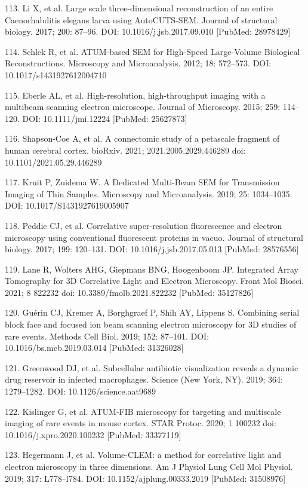 \documentclass{article}
\begin{document}
\begin{hangpars}
113. Li X, et al. Large scale three-dimensional reconstruction of an entire Caenorhabditis elegans larva using AutoCUTS-SEM. Journal of structural biology. 2017; 200: 87–96. DOI: 10.1016/j.jsb.2017.09.010 [PubMed: 28978429]

114. Schlek R, et al. ATUM-based SEM for High-Speed Large-Volume Biological Reconstructions. Microscopy and Microanalysis. 2012; 18: 572–573. DOI: 10.1017/s1431927612004710

115. Eberle AL, et al. High-resolution, high-throughput imaging with a multibeam scanning electron microscope. Journal of Microscopy. 2015; 259: 114–120. DOI: 10.1111/jmi.12224 [PubMed: 25627873]

116. Shapson-Coe A, et al. A connectomic study of a petascale fragment of human cerebral cortex. bioRxiv. 2021; 2021.2005.2029.446289 doi: 10.1101/2021.05.29.446289

117. Kruit P, Zuidema W. A Dedicated Multi-Beam SEM for Transmission Imaging of Thin Samples. Microscopy and Microanalysis. 2019; 25: 1034–1035. DOI: 10.1017/S1431927619005907

118. Peddie CJ, et al. Correlative super-resolution fluorescence and electron microscopy using conventional fluorescent proteins in vacuo. Journal of structural biology. 2017; 199: 120–131. DOI: 10.1016/j.jsb.2017.05.013 [PubMed: 28576556]

119. Lane R, Wolters AHG, Giepmans BNG, Hoogenboom JP. Integrated Array Tomography for 3D Correlative Light and Electron Microscopy. Front Mol Biosci. 2021; 8 822232 doi: 10.3389/fmolb.2021.822232 [PubMed: 35127826]

120. Guérin CJ, Kremer A, Borghgraef P, Shih AY, Lippens S. Combining serial block face and focused ion beam scanning electron microscopy for 3D studies of rare events. Methods Cell Biol. 2019; 152: 87–101. DOI: 10.1016/bs.mcb.2019.03.014 [PubMed: 31326028]

121. Greenwood DJ, et al. Subcellular antibiotic visualization reveals a dynamic drug reservoir in infected macrophages. Science (New York, NY). 2019; 364: 1279–1282. DOI: 10.1126/science.aat9689

122. Kislinger G, et al. ATUM-FIB microscopy for targeting and multiscale imaging of rare events in mouse cortex. STAR Protoc. 2020; 1 100232 doi: 10.1016/j.xpro.2020.100232 [PubMed: 33377119]

123. Hegermann J, et al. Volume-CLEM: a method for correlative light and electron microscopy in three dimensions. Am J Physiol Lung Cell Mol Physiol. 2019; 317: L778–l784. DOI: 10.1152/ajplung.00333.2019 [PubMed: 31508976]


\end{hangpars}
\end{document}
